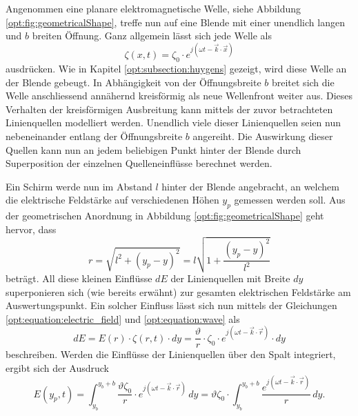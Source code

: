 Angenommen eine planare elektromagnetische Welle, siehe Abbildung \ref{opt:fig:geometricalShape}, treffe nun auf eine Blende mit einer unendlich langen und $b$ breiten Öffnung.
Ganz allgemein lässt sich jede Welle als
\begin{equation}
\zeta(x, t)
=
\zeta_0 \cdot e^{j(\omega t - \vec{k}\cdot\vec{x})}
\label{opt:equation:wave}
\end{equation}
ausdrücken.
Wie in Kapitel \ref{opt:subsection:huygens} gezeigt, wird diese Welle an der Blende gebeugt.
In Abhängigkeit von der Öffnungsbreite $b$ breitet sich die Welle anschliessend annähernd kreisförmig als neue Wellenfront weiter aus.
Dieses Verhalten der kreisförmigen Ausbreitung kann mittels der zuvor betrachteten Linienquellen modelliert werden.
Unendlich viele dieser Linienquellen seien nun nebeneinander entlang der Öffnungsbreite $b$ angereiht.
Die Auswirkung dieser Quellen kann nun an jedem beliebigen Punkt hinter der Blende durch Superposition der einzelnen Quelleneinflüsse berechnet werden.

Ein Schirm werde nun im Abstand $l$ hinter der Blende angebracht, an welchem die elektrische Feldstärke auf verschiedenen Höhen $y_p$ gemessen werden soll.
Aus der geometrischen Anordnung in Abbildung \ref{opt:fig:geometricalShape} geht hervor, dass
\begin{equation}
r
=
\sqrt{l^2 + (y_p-y)^2}
=
l \sqrt{1 + \frac{(y_p-y)^2}{l^2}}
\label{opt:equation:distance_r}
\end{equation}
beträgt. All diese kleinen Einflüsse $dE$ der Linienquellen mit Breite $dy$ superponieren sich (wie bereits erwähnt) zur gesamten elektrischen Feldstärke am Auswertungspunkt.
Ein solcher Einfluss lässt sich nun mittels der Gleichungen \eqref{opt:equation:electric_field} und \eqref{opt:equation:wave} als
\begin{equation*}
dE
=
E(r) \cdot \zeta(r, t) \cdot dy
=
\frac{\vartheta}{r} \cdot \zeta_0 \cdot e^{j(\omega t - \vec{k}\cdot\vec{r})} \cdot dy
\end{equation*}
beschreiben.
Werden die Einflüsse der Linienquellen über den Spalt integriert, ergibt sich der Ausdruck
\begin{equation*}
E(y_p, t)
=
\int_{y_b}^{y_b+b}\frac{\vartheta\zeta_0}{r} \cdot e^{j(\omega t - \vec{k}\cdot\vec{r})} \,dy
=
\vartheta\zeta_0 \cdot \int_{y_b}^{y_b+b}\frac{e^{j(\omega t - \vec{k}\cdot\vec{r})}}{r} \,dy
.
\end{equation*}

